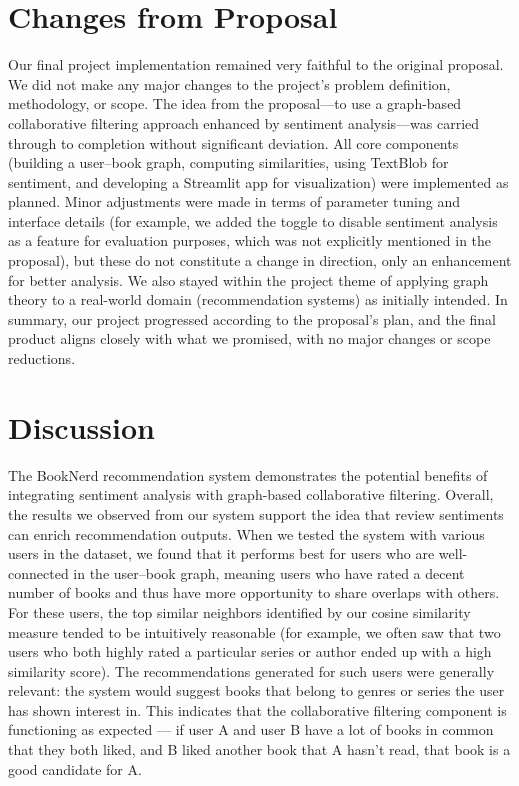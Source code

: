 \documentclass[11pt]{article}
\begin{document}
\section{Changes from Proposal}
Our final project implementation remained very faithful to the original proposal. We did not make any major changes to the project’s problem definition, methodology, or scope. The idea from the proposal—to use a graph-based collaborative filtering approach enhanced by sentiment analysis—was carried through to completion without significant deviation. All core components (building a user–book graph, computing similarities, using TextBlob for sentiment, and developing a Streamlit app for visualization) were implemented as planned. Minor adjustments were made in terms of parameter tuning and interface details (for example, we added the toggle to disable sentiment analysis as a feature for evaluation purposes, which was not explicitly mentioned in the proposal), but these do not constitute a change in direction, only an enhancement for better analysis. We also stayed within the project theme of applying graph theory to a real-world domain (recommendation systems) as initially intended. In summary, our project progressed according to the proposal’s plan, and the final product aligns closely with what we promised, with no major changes or scope reductions.

\section{Discussion}
The BookNerd recommendation system demonstrates the potential benefits of integrating sentiment analysis with graph-based collaborative filtering. Overall, the results we observed from our system support the idea that review sentiments can enrich recommendation outputs. When we tested the system with various users in the dataset, we found that it performs best for users who are well-connected in the user–book graph, meaning users who have rated a decent number of books and thus have more opportunity to share overlaps with others. For these users, the top similar neighbors identified by our cosine similarity measure tended to be intuitively reasonable (for example, we often saw that two users who both highly rated a particular series or author ended up with a high similarity score). The recommendations generated for such users were generally relevant: the system would suggest books that belong to genres or series the user has shown interest in. This indicates that the collaborative filtering component is functioning as expected — if user A and user B have a lot of books in common that they both liked, and B liked another book that A hasn’t read, that book is a good candidate for A. 
\end{document}
